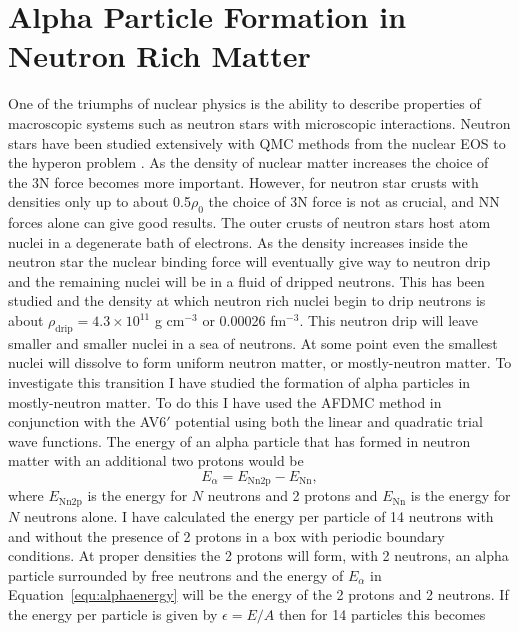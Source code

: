 \section{Alpha Particle Formation in Neutron Rich Matter}
One of the triumphs of nuclear physics is the ability to describe properties of macroscopic systems such as neutron stars with microscopic interactions. Neutron stars have been studied extensively with QMC methods from the nuclear EOS \cite{sarsa2003,gandolfi2014} to the hyperon problem \cite{lonardoni2015,gandolfi2018}. As the density of nuclear matter increases the choice of the 3N force becomes more important. However, for neutron star crusts with densities only up to about 0.5$\rho_0$ the choice of 3N force is not as crucial, and NN forces alone can give good results. The outer crusts of neutron stars host atom nuclei in a degenerate bath of electrons. As the density increases inside the neutron star the nuclear binding force will eventually give way to neutron drip and the remaining nuclei will be in a fluid of dripped neutrons. This has been studied \cite{lorenz1993,chamel2015} and the density at which neutron rich nuclei begin to drip neutrons is about $\rho_\text{drip} = 4.3\times10^{11}$ g cm$^{-3}$ or 0.00026 fm$^{-3}$. This neutron drip will leave smaller and smaller nuclei in a sea of neutrons. At some point even the smallest nuclei will dissolve to form uniform neutron matter, or mostly-neutron matter. To investigate this transition I have studied the formation of alpha particles in mostly-neutron matter. To do this I have used the AFDMC method in conjunction with the AV6$'$ potential using both the linear and quadratic trial wave functions. The energy of an alpha particle that has formed in neutron matter with an additional two protons would be
\begin{equation}
   E_\alpha = E_\text{Nn2p} - E_\text{Nn},
   \label{equ:alphaenergy}
\end{equation}
where $E_\text{Nn2p}$ is the energy for $N$ neutrons and 2 protons and $E_\text{Nn}$ is the energy for $N$ neutrons alone. I have calculated the energy per particle of 14 neutrons with and without the presence of 2 protons in a box with periodic boundary conditions. At proper densities the 2 protons will form, with 2 neutrons, an alpha particle surrounded by free neutrons and the energy of $E_\alpha$ in Equation~\ref{equ:alphaenergy} will be the energy of the 2 protons and 2 neutrons. If the energy per particle is given by $\epsilon = E/A$ then for 14 particles this becomes
